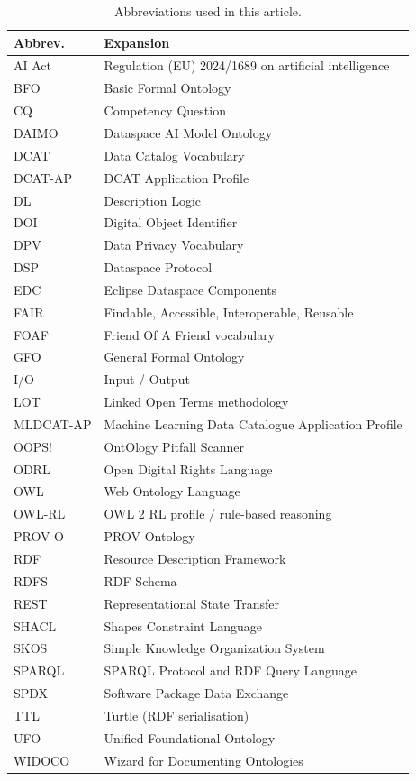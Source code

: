 \documentclass[Afour,sagev,times]{sagej}
\begin{document}
\begin{table}[tb]
\small\sf\centering
\caption{Abbreviations used in this article.\label{tab:glossary}}
\begin{tabular}{@{}p{2.2cm}p{10cm}@{}}
\toprule
\textbf{Abbrev.} & \textbf{Expansion} \\
\midrule
AI Act & Regulation (EU) 2024/1689 on artificial intelligence \\
BFO & Basic Formal Ontology \\
CQ & Competency Question \\
DAIMO & Dataspace AI Model Ontology \\
DCAT & Data Catalog Vocabulary \\
DCAT-AP & DCAT Application Profile \\
DL & Description Logic \\
DOI & Digital Object Identifier \\
DPV & Data Privacy Vocabulary \\
DSP & Dataspace Protocol \\
EDC & Eclipse Dataspace Components \\
FAIR & Findable, Accessible, Interoperable, Reusable \\
FOAF & Friend Of A Friend vocabulary \\
GFO & General Formal Ontology \\
I/O & Input / Output \\
LOT & Linked Open Terms methodology \\
MLDCAT-AP & Machine Learning Data Catalogue Application Profile \\
OOPS! & OntOlogy Pitfall Scanner \\
ODRL & Open Digital Rights Language \\
OWL & Web Ontology Language \\
OWL-RL & OWL 2 RL profile / rule-based reasoning \\
PROV-O & PROV Ontology \\
RDF & Resource Description Framework \\
RDFS & RDF Schema \\
REST & Representational State Transfer \\
SHACL & Shapes Constraint Language \\
SKOS & Simple Knowledge Organization System \\
SPARQL & SPARQL Protocol and RDF Query Language \\
SPDX & Software Package Data Exchange \\
TTL & Turtle (RDF serialisation) \\
UFO & Unified Foundational Ontology \\
WIDOCO & Wizard for Documenting Ontologies \\
\bottomrule
\end{tabular}
\end{table}
\end{document}
